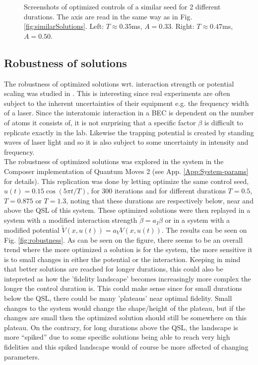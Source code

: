 \documentclass[a4paper, twocolumn]{revtex4-1}
\begin{document}
\begin{figure}
\begin{subfigure}{0.4\columnwidth}
	\end{subfigure}
	\caption{Screenshots of optimized controls of a similar seed for 2 different durations. The axis are read in the same way as in Fig. \ref{fig:similarSolutions}. Left: $T\approx 0.35$ms, $A=0.33$. Right: $T\approx 0.47$ms, $A=0.50$.}
	\label{fig:SimilarTimescales}
\end{figure}

\subsection{\label{subsec:robustness} Robustness of solutions}
The robustness of optimized solutions wrt. interaction strength or potential scaling was studied in \cite{GroupPaper}. This is interesting since real experiments are often subject to the inherent uncertainties of their equipment e.g. the frequency width of a laser. Since the interatomic interaction in a BEC is dependent on the number of atoms it consists of, it is not surprising that a specific factor $\beta$ is difficult to replicate exactly in the lab. Likewise the trapping potential is created by standing waves of laser light and so it is also subject to some uncertainty in intensity and frequency.  \\

The robustness of optimized solutions was explored in the system in the Composer implementation of Quantum Moves 2 (see App. \ref{App:System-params} for details). This replication was done by letting  optimize the same control seed, $u(t)=0.15\cos(5\pi t/T)$, for $300$ iterations and for different durations $T=0.5$, $T=0.875$ or $T=1.3$, noting that these durations are respectively below, near and above the QSL of this system. These optimized solutions were then replayed in a system with a modified interaction strength $\tilde{\beta} = a_I \beta$ or in a system with a modified potential $\tilde{V}(x,u(t)) = a_V V(x,u(t))$. The results can be seen on Fig. \ref{fig:robustness}. As can be seen on the figure, there seems to be an overall trend where the more optimized a solution is for the system, the more sensitive it is to small changes in either the potential or the interaction. Keeping in mind that better solutions are reached for longer durations, this could also be intepreted as how the 'fidelity landscape' becomes increasingly more complex the longer the control duration is. This could make sense since for small durations below the QSL, there could be many 'plateaus' near optimal fidelity. Small changes to the system would change the shape/height of the plateau, but if the changes are small then the optimized solution should still be somewhere on this plateau. On the contrary, for long durations above the QSL, the landscape is more ``spiked'' due to some specific solutions being able to reach very high fidelities and this spiked landscape would of course be more affected of changing parameters. \\
\end{document}
